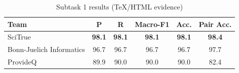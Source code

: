\begin{table}[ht]
\centering
\small
\caption{Subtask 1 results (TeX/HTML evidence)}
\label{tab:subtask1_tex}
\begin{tabular}{lccccc}
\toprule
Team & P & R & Macro-F1 & Acc. & Pair Acc. \\
\midrule
SciTrue & \textbf{98.1} & \textbf{98.1} & \textbf{98.1} & \textbf{98.1} & \textbf{98.4} \\
Bonn-Juelich Informatics & 96.7 & 96.7 & 96.7 & 96.7 & 97.7 \\
ProvideQ & 89.9 & 90.0 & 90.0 & 90.0 & 82.4 \\
\bottomrule
\end{tabular}
\end{table}
